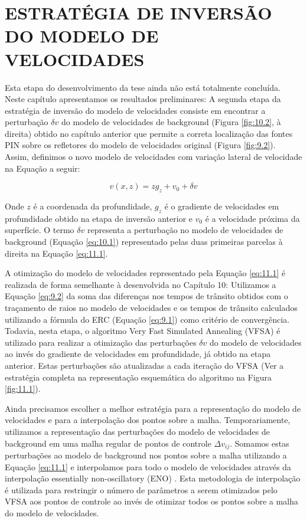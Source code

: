 \chapter{ESTRATÉGIA DE INVERSÃO DO MODELO DE VELOCIDADES}
\label{cap11}

Esta etapa do desenvolvimento da tese ainda não está totalmente concluída. Neste capítulo apresentamos
os resultados preliminares:
A segunda etapa da estratégia de inversão do modelo de velocidades consiste em encontrar a perturbação
$\delta v$ do modelo de velocidades de background (Figura \ref{fig:10.2}, à direita)
obtido no capítulo anterior que permite a correta 
localização das fontes PIN sobre os refletores do modelo de velocidades original (Figura \ref{fig:9.2}).
Assim, definimos o novo modelo de velocidades com variação lateral de velocidade na
Equação a seguir:

\begin{equation}
\label{eq:11.1}
v(x,z)=z g_z+v_0+\delta v
\end{equation}

Onde $z$ é a coordenada da profundidade, $g_z$ é o gradiente de velocidades em profundidade obtido na
etapa de inversão anterior e $v_0$ é a velocidade próxima da superfície. O termo $\delta v$ representa
a perturbação no modelo de velocidades de background (Equação \ref{eq:10.1})
representado pelas duas primeiras parcelas à direita na 
Equação \ref{eq:11.1}.

A otimização do modelo de velocidades
representado pela Equação \ref{eq:11.1}
é realizada de forma semelhante à desenvolvida no Capítulo 10:
Utilizamos a Equação \ref{eq:9.2} da soma das diferenças nos tempos de trânsito obtidos com o traçamento de raios no modelo de velocidades e os tempos de trânsito calculados utilizando a fórmula do ERC
(Equação \ref{eq:9.1}) como critério de convergência.
Todavia, nesta etapa, o algoritmo Very Fast Simulated Annealing (VFSA) é utilizado para realizar a otimização das perturbações $\delta v$ do modelo de velocidades ao invés do gradiente de velocidades em
profundidade, já obtido na etapa anterior. Estas perturbações são atualizadas a cada iteração do VFSA (Ver a estratégia completa na representação esquemática do algoritmo na Figura \ref{fig:11.1}).

Ainda precisamos escolher a melhor estratégia para a representação do modelo de velocidades
e para a interpolação dos pontos sobre a malha. Temporariamente, utilizamos a representação
das perturbações do modelo de velocidades de background em uma malha regular de pontos de
controle $\Delta v_{ij}$. Somamos estas perturbações ao modelo de background nos pontos sobre
a malha utilizando a Equação \ref{eq:11.1} e interpolamos para todo o modelo de velocidades
através da interpolação essentially non-oscillatory (ENO) \cite{eno1,eno2}. Esta metodologia
de interpolação é utilizada para restringir o número de parâmetros a serem otimizados pelo VFSA
aos pontos de controle ao invés de otimizar todos os pontos sobre a malha do modelo de velocidades.

